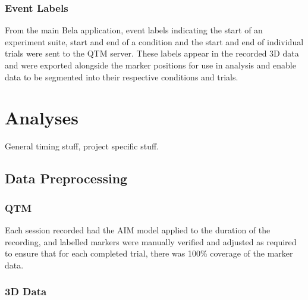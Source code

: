 \documentclass[10pt,a4paper,onecolumn]{article}
\begin{document}
\hypertarget{event-labels}{%
\subsubsection{Event Labels}\label{event-labels}}

From the main Bela application, event labels indicating the start of an experiment suite, start and end of a condition and the start and end of individual trials were sent to the QTM server. These labels appear in the recorded 3D data and were exported alongside the marker positions for use in analysis and enable data to be segmented into their respective conditions and trials.

\hypertarget{analyses}{%
\section{Analyses}\label{analyses}}

General timing stuff, project specific stuff.

\hypertarget{data-preprocessing}{%
\subsection{Data Preprocessing}\label{data-preprocessing}}

\hypertarget{qtm}{%
\subsubsection{QTM}\label{qtm}}

Each session recorded had the AIM model applied to the duration of the recording, and labelled markers were manually verified and adjusted as required to ensure that for each completed trial, there was 100\% coverage of the marker data.

\hypertarget{d-data}{%
\subsubsection{3D Data}\label{d-data}}
\end{document}
